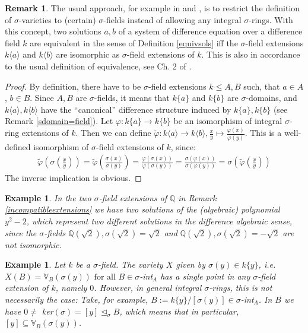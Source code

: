 \documentclass{article}
\def\Q{\mathbb{Q}}
\def\VV{\mathbb{V}}
\def\s{\sigma}
\def\si{\unlhd_{\sigma}}
\def\fa{\text{ for all }}
\newenvironment{bew}{\begin{proof}[Proof]}{\end{proof}}
\theoremstyle{plain}
\newtheorem{ex}[Satz]{Example}
\theoremstyle{definition}
\newtheorem{rem}[Satz]{Remark}
\begin{document}
\begin{rem}
The usual approach, for example in \cite{cohn} and \cite{levin}, is to restrict the definition of $\s$-varieties to (certain) $\s$-fields instead of allowing any integral $\s$-rings. With this concept,
two solutions $a,b$ of a system of difference equation over a difference field $k$ are equivalent in the sense of Definition \ref{equivsols} iff the $\s$-field extensions $k\langle a \rangle$ and $k\langle b \rangle$ are isomorphic as $\s$-field extensions of $k$.
This is also in accordance to the usual definition of equivalence, see Ch. 2 of \cite{wibmer}.
\begin{bew}
By definition, there have to be $\s$-field extensions $k \leq A,B$ such, that $a \in A$, $b \in B$. Since $A,B$ are $\s$-fields, it means that $k\{a\}$ and $k\{b\}$ are $\s$-domains, 
and $k\langle a \rangle, k\langle b \rangle$ have the ``canonical'' difference structure induced by $k\{a\}, k\{b\}$ (see Remark \ref{sdomain=field}). Let $\varphi: k\{a\} \rightarrow k\{b\}$ be an isomorphism of integral $\s$-ring extensions of $k$.
Then we can define $\tilde \varphi: k \langle a \rangle \rightarrow k\langle b \rangle, \frac{x}{y} \mapsto \frac{\varphi(x)}{\varphi{(y)}}$. This is a well-defined isomorphism of $\s$-field extensions of $k$, since:
\begin{align*}
\tilde \varphi (\s (\frac{x}{y})) = \tilde \varphi( \frac{\s(x)}{\s(y)}) = \frac{ \varphi (\s (x))}{ \varphi (\s(y))} =  \frac{\s (\varphi (x))}{\s (\varphi(y))} = \s( \tilde \varphi (\frac{x}{y}))
\end{align*}
The inverse implication is obvious.
\end{bew}
\end{rem}

\begin{ex}
In the two $\s$-field extensions of $\Q$ in Remark \ref{incompatibleextensions} we have two solutions of the (algebraic) polynomial $y^2-2$, which represent two different solutions in the difference algebraic sense,
since the $\s$-fields $\Q(\sqrt{2}), \s(\sqrt{2}) = \sqrt{2}$ and $\Q(\sqrt{2}), \s(\sqrt{2}) = -\sqrt{2}$ are not isomorphic. 
\end{ex}

\begin{ex}
Let $k$ be a $\s$-field. The variety $X$ given by $\s(y) \in k\{y\}$, i.e. $X(B) = \VV_B(\s(y)) \fa B \in \s$-int$_A$ has a single point in any $\s$-field extension of $k$, namely $0$. However, in general integral $\s$-rings,
this is not necessarily the case: Take, for example, $B:= k\{y\}/[\s(y)] \in \s$-int$_A$. In $B$ we have $0 \neq $ ker$(\s) = [y] \si B$, which means that in particular, $[y] \subseteq \VV_B(\s(y))$.
\end{ex}
\end{document}
